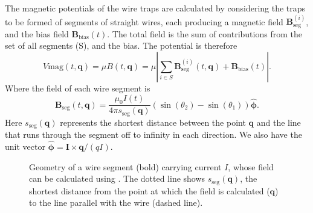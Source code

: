 The magnetic potentials of the wire traps are calculated by considering the
traps to be formed of segments of straight wires, each producing a magnetic
field $\mathbf{B}_\text{seg}^{(i)}$, and the bias field
$\mathbf{B}_\text{bias}(t)$.  The total field is the sum of contributions from
the set of all segments (S), and the bias. The potential is therefore
%
\begin{equation} V\text{mag}(t, \mathbf{q}) = \mu B (t, \mathbf{q}) = \mu
\left| \sum_{i\in S} \mathbf{B}_\text{seg}^{(i)}(t, \mathbf{q}) +
\mathbf{B}_\text{bias}(t)\right|.  \end{equation}
%
Where the field of each wire segment is~\cite{Griffiths2017}
%
\begin{equation} \mathbf{B}_\text{seg}(t, \mathbf{q}) = \frac{\mu_0 I(t)}{4\pi
s_\text{seg}(\mathbf{q})} (\sin(\theta_2)  -
\sin(\theta_1))\hat{\mathbf{\phi}}. \label{design:eq:segmentfield}
\end{equation}
%
Here $s_\text{seg}(\mathbf{q})$ represents the shortest distance between the
point $\mathbf{q}$ and the line that runs through the segment off to infinity
in each direction. We also have the unit vector $\hat{\mathbf{\phi}} =
\mathbf{I}\times\mathbf{q}/(qI)$.

\begin{figure}[h]
\centering
  \caption{Geometry of a wire segment (bold) carrying current $I$, whose field
  can be calculated using . The dotted line
  shows $s_\text{seg}(\mathbf{q})$, the shortest distance from the point at
  which the field is calculated ($\mathbf{q}$) to the line parallel with the
  wire (dashed line).
  }
  \label{design:fig:wiresegment}
\end{figure}


